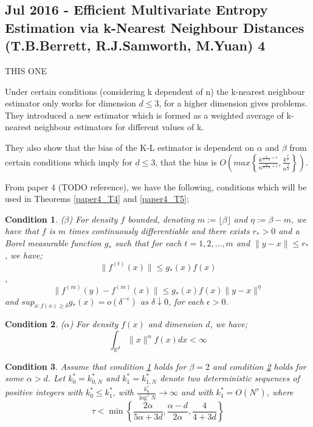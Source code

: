 \documentclass{article}
\newtheorem{remark}{Condition}
\begin{document}
\subsection{Jul 2016 - Efficient Multivariate Entropy Estimation via k-Nearest Neighbour Distances (T.B.Berrett, R.J.Samworth, M.Yuan) 4} THIS ONE

Under certain conditions (considering k dependent of n) the k-nearest neighbour estimator only works for dimension $d \leq 3$, for a higher dimension gives problems. They introduced a new estimator which is formed as a weighted average of k-nearest neighbour estimators for different values of k.

They also show that the bias of the K-L estimator is dependent on $\alpha$ and $\beta$ from certain conditions which imply for $d \leq 3$,  that the bias is $O\left(max \left\{ \frac{k^{\frac{\alpha }{\alpha + d} + \epsilon}}{n^{\frac{\alpha}{\alpha + d} + \epsilon}}, \frac{k^{\frac{\beta}{d}}}{n^{\frac{\beta}{d}}} \right\} \right)$.



From paper 4 (TODO reference), we have the following, conditions which will be used in Theorems \ref{paper4_T4} and \ref{paper4_T5};
\begin{remark} ($\beta$) \label{A1}
For density $f$ bounded, denoting $m := \lfloor \beta \rfloor$ and $\eta := \beta -m$, we have that $f$ is $m$ times continuously differentiable and there exists $r_{*} > 0$ and a Borel measurable function $g_{*}$ such that for each $t = 1, 2, ... , m$ and $\|y-x\| \leq r_{*}$, we have;
\begin{equation}
\| f^{(t)} (x) \| \leq g_{*}(x)f(x) \nonumber
\end{equation},
\begin{equation}
\| f^{(m)} (y) - f^{(m)} (x) \| \leq g_{*}(x)f(x) \|y-x\|^{\eta} \nonumber
\end{equation}
and $sup_{x:f(x)\geq \delta} g_{*}(x) = o(\delta^{-\epsilon})$ as $\delta \downarrow 0$, for each $\epsilon > 0$.
\end{remark}

\begin{remark} ($\alpha$) \label{A2}
For density $f(x)$ and dimension $d$, we have;
\begin{equation}
\int_{\mathbb{R}^{d}} \| x \|^{\alpha} f(x) dx < \infty \nonumber
\end{equation}
\end{remark}

\begin{remark} \label{A3}
Assume that condition \ref{A1} holds for $\beta = 2$ and condition \ref{A2} holds for some $\alpha > d$. Let $k_{0}^{*} = k_{0, N}^{*}$ and $k_{1}^{*} = k_{1, N}^{*}$ denote two deterministic sequences of positive integers with $k_{0}^{*} \leq k_{1}^{*}$, with $\frac{k_{0}^{*}}{\log^{5}{N}} \to \infty$ and with $k_{1}^{*} = O(N^{\tau})$, where
\begin{equation}
\tau < \min \left\{ \frac{2 \alpha}{5 \alpha + 3d} , \frac{\alpha - d}{2 \alpha} , \frac{4}{4 + 3d} \right\} \nonumber
\end{equation}
\end{remark}
\end{document}
